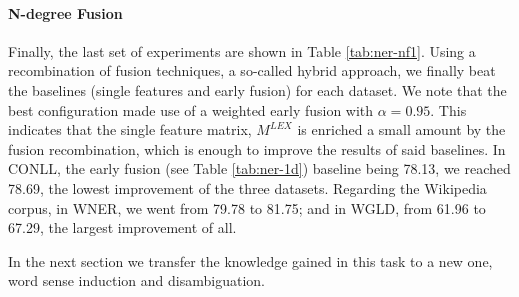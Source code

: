 \documentclass{llncs}
\newcommand\mlex{M^{\scriptscriptstyle LEX}}
\begin{document}
\paragraph{N-degree Fusion}
Finally, the last set of experiments are shown in Table \ref{tab:ner-nf1}. Using a recombination of fusion techniques, a so-called hybrid approach, we finally beat the baselines (single features and early fusion) for each dataset. We note that the best configuration made use of a weighted early fusion with $\alpha=0.95$. This indicates that the single feature matrix, $\mlex$ is enriched a small amount by the fusion recombination, which is enough to improve the results of said baselines. In CONLL, the early fusion (see Table \ref{tab:ner-1d}) baseline being 78.13, we reached 78.69, the lowest improvement of the three datasets. Regarding the Wikipedia corpus, in WNER, we went from 79.78 to 81.75; and in WGLD, from 61.96 to 67.29, the largest improvement of all.

In the next section we transfer the knowledge gained in this task to a new one, word sense induction and disambiguation.
\end{document}
